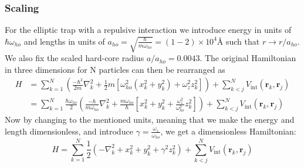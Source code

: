 \documentclass[12pt,a4paper,english]{article}
\begin{document}
\subsubsection{Scaling}
\label{subsubsect:Scaling}
For the elliptic trap with a repulsive interaction we introduce energy in units of $\hbar\omega_{ho}$ and lengths in units of $a_{ho}=\sqrt{\frac{\hbar}{m\omega_{ho}}}=(1-2)\times10^4$Å such that $r\rightarrow r/a_{ho}$. We also fix the scaled hard-core radius $a/a_{ho}=0.0043$. The original Hamiltonian in three dimensions for N particles can then be rearranged as
\begin{align*}
H&=\sum_{k=1}^N\left(\frac{-\hbar^2}{2m}\nabla_k^2+\frac{1}{2}m\left[\omega_{ho}^2(x_k^2+y_k^2)+\omega_z^2z_k^2\right]\right)+\sum_{k<j}^{N}V_{\text{int}}(\textbf{r}_k,\textbf{r}_j)\\
&=\sum_{k=1}^N\frac{\hbar\omega_{ho}}{2}\left(\frac{-\hbar}{m\omega_{ho}}\nabla_k^2+\frac{m\omega_{ho}}{\hbar}\left[x_k^2+y_k^2+\frac{\omega_z^2}{\omega_{ho}^2}z_k^2\right]\right)+\sum_{k<j}^{N}V_{\text{int}}(\textbf{r}_k,\textbf{r}_j)
\end{align*}
Now by changing to the mentioned units, meaning that we make the energy and length dimensionless, and introduce $\gamma=\frac{\omega_z}{\omega_{ho}}$, we get a dimensionless Hamiltonian:
\begin{equation}
\label{eq:H_scaled}
H=\sum_{k=1}^N\frac{1}{2}\left(-\nabla_k^2+x_k^2+y_k^2+\gamma^2z_k^2\right)+\sum_{k<j}^{N}V_{\text{int}}(\textbf{r}_k,\textbf{r}_j)
\end{equation}
\end{document}
